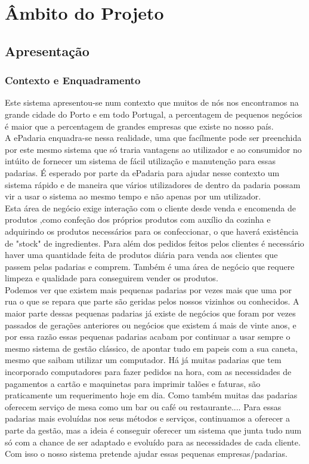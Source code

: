 \chapter{Âmbito do Projeto}
\label{ambito}
\section{Apresentação}
\subsection{Contexto e Enquadramento}
Este sistema apresentou-se num contexto que muitos de nós nos encontramos na grande cidade do Porto e em todo Portugal, a percentagem de pequenos negócios é maior que a percentagem de grandes empresas que existe no nosso país.\\
A ePadaria enquadra-se nessa realidade, uma que facílmente pode ser preenchida por este mesmo sistema que só traria vantagens ao utilizador e ao consumidor no intúito de fornecer um sistema de fácil utilização e manutenção para essas padarias. É esperado por parte da ePadaria para ajudar nesse contexto um sistema rápido e de maneira que vários utilizadores de dentro da padaria possam vir a usar o sistema ao mesmo tempo e não apenas por um utilizador. \\
Esta área de negócio exige interação com o cliente desde venda e encomenda de produtos ,como confeção dos próprios produtos com auxílio da cozinha e adquirindo os produtos necessários para os confeccionar, o que haverá existência de "stock" de ingredientes. Para além dos pedidos feitos pelos clientes é necessário haver uma quantidade feita de produtos diária para venda aos clientes que passem pelas padarias e comprem. Também é uma área de negócio que requere limpeza e qualidade para conseguirem vender os produtos.\\
 Podemos ver que existem mais pequenas padarias por vezes mais que uma por rua o que se repara que parte são geridas pelos nossos vizinhos ou conhecidos. A maior parte dessas pequenas padarias já existe de negócios que foram por vezes passados de gerações anteriores ou negócios que existem á mais de vinte anos, e por essa razão essas pequenas padarias acabam por continuar a usar sempre o mesmo sistema de gestão clássico, de apontar tudo em papeis com a sua caneta, mesmo que saibam utilizar um computador. Há já muitas padarias que tem incorporado computadores para fazer pedidos na hora, com as necessidades de pagamentos a cartão e maquinetas para imprimir talões e faturas, são praticamente um requerimento hoje em dia. Como também muitas das padarias oferecem serviço de mesa como um bar ou café ou restaurante.... Para essas padarias mais evoluídas nos seus métodos e serviços, continuamos a oferecer a parte da gestão, mas a ideia é conseguir oferecer um sistema que junta tudo num só com a chance de ser adaptado e evoluído para as necessidades de cada cliente.
   Com isso o nosso sistema pretende ajudar essas pequenas empresas/padarias.\\





